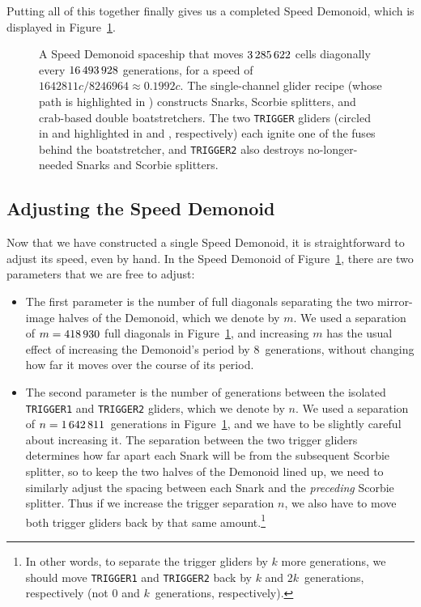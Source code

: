 Putting all of this together finally gives us a completed Speed Demonoid, which is displayed in Figure~\ref{fig:speed_demonoid}.

\begin{figure}[!htbp]
	\centering
	\caption{A Speed Demonoid spaceship that moves $3{\,}285{\,}622$ cells diagonally every $16{\,}493{\,}928$ generations, for a speed of $1642811c/8246964 \approx 0.1992c$. The single-channel glider recipe (whose path is highlighted in ) constructs Snarks, Scorbie splitters, and crab-based double boatstretchers. The two \texttt{TRIGGER} gliders (circled in  and highlighted in  and , respectively) each ignite one of the fuses behind the boatstretcher, and \texttt{TRIGGER2} also destroys no-longer-needed Snarks and Scorbie splitters.}\label{fig:speed_demonoid}
\end{figure}


\subsection{Adjusting the Speed Demonoid}\label{sec:speed_demonoid_adjust}

Now that we have constructed a single Speed Demonoid, it is straightforward to adjust its speed, even by hand. In the Speed Demonoid of Figure~\ref{fig:speed_demonoid}, there are two parameters that we are free to adjust:\smallskip

\begin{itemize}
	\item[1)] The first parameter is the number of full diagonals separating the two mirror-image halves of the Demonoid, which we denote by $m$. We used a separation of $m = 418{\,}930$ full diagonals in Figure~\ref{fig:speed_demonoid}, and increasing $m$ has the usual effect of increasing the Demonoid's period by $8$~generations, without changing how far it moves over the course of its period.\smallskip
	
	\item[2)] The second parameter is the number of generations between the isolated \texttt{TRIGGER1} and \texttt{TRIGGER2} gliders, which we denote by $n$. We used a separation of $n = 1{\,}642{\,}811$~generations in Figure~\ref{fig:speed_demonoid}, and we have to be slightly careful about increasing it. The separation between the two trigger gliders determines how far apart each Snark will be from the subsequent Scorbie splitter, so to keep the two halves of the Demonoid lined up, we need to similarly adjust the spacing between each Snark and the \emph{preceding} Scorbie splitter. Thus if we increase the trigger separation $n$, we also have to move both trigger gliders back by that same amount.\footnote{In other words, to separate the trigger gliders by $k$ more generations, we should move \texttt{TRIGGER1} and \texttt{TRIGGER2} back by $k$ and $2k$~generations, respectively (not $0$ and $k$~generations, respectively).}\smallskip
\end{itemize}

